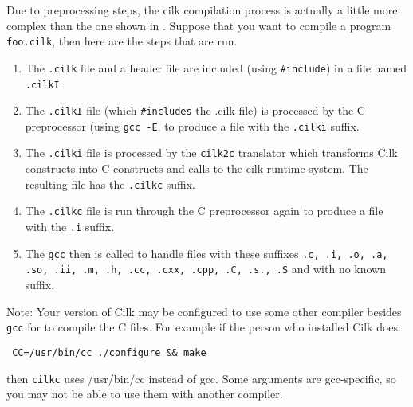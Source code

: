 Due to preprocessing steps, the cilk compilation process is actually a
little more complex than the one shown in .  Suppose
that you want to compile a program \texttt{foo.cilk}, then here are
the steps that are run.
\begin{enumerate}
\item The \texttt{.cilk} file and a header file are included (using \verb+#include+) in a file named \texttt{.cilkI}.
\item The \texttt{.cilkI} file (which \verb+#includes+ the .cilk file) is processed by the C preprocessor
(using \texttt{gcc -E}, to produce a file with the \texttt{.cilki} suffix.
\item The \texttt{.cilki} file is processed by the \texttt{cilk2c}
translator which transforms Cilk constructs into C constructs and
calls to the cilk runtime system.  The resulting file has the
\texttt{.cilkc} suffix.
\item The \texttt{.cilkc} file is run through the C preprocessor again
to produce a file with the \texttt{.i} suffix.
\item The \texttt{gcc} then is called to handle files with these
suffixes \texttt{.c, .i, .o, .a, .so, .ii, .m, .h, .cc, .cxx, .cpp,
.C, .s., .S} and with no known suffix.
\end{enumerate}

Note: Your version of Cilk may be configured to use some other
compiler besides \texttt{gcc} for to compile the C files.  For example
if the person who installed Cilk does:
\begin{verbatim}
 CC=/usr/bin/cc ./configure && make
\end{verbatim}
then \texttt{cilkc} uses /usr/bin/cc instead of gcc.  Some arguments
are gcc-specific, so you may not be able to use them with another
compiler.

